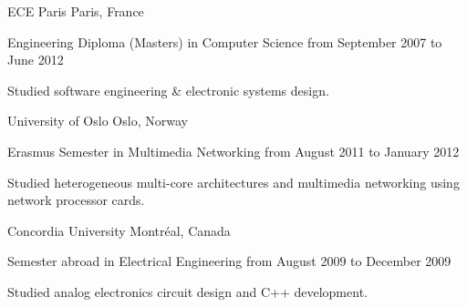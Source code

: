\documentclass[10pt, a4paper]{awesome-cv}
\begin{document}

\begin{cventries}
	\cventrytitle
	{ECE Paris}
	{Paris, France}

	\cventry
	{Engineering Diploma (Masters) in Computer Science}
	{from September 2007 to June 2012}
	{
		\begin{cvparagraph}
			Studied software engineering \& electronic systems design.
		\end{cvparagraph}
		\vspace{4pt}
	}

	\cventrytitle
	{University of Oslo}
	{Oslo, Norway}

	\cventry
	{Erasmus Semester in Multimedia Networking}
	{from August 2011 to January 2012}
	{
		\begin{cvparagraph}
			Studied heterogeneous multi-core architectures and multimedia networking using network processor cards.
		\end{cvparagraph}
		\vspace{4pt}
	}

	\cventrytitle
	{Concordia University}
	{Montréal, Canada}

	\cventry
	{Semester abroad in Electrical Engineering}
	{from August 2009 to December 2009}
	{
		\begin{cvparagraph}
			Studied analog electronics circuit design and C++ development.
		\end{cvparagraph}
		\vspace{4pt}
	}

\end{cventries}


\begin{cventries}
\end{cventries}
\end{document}
